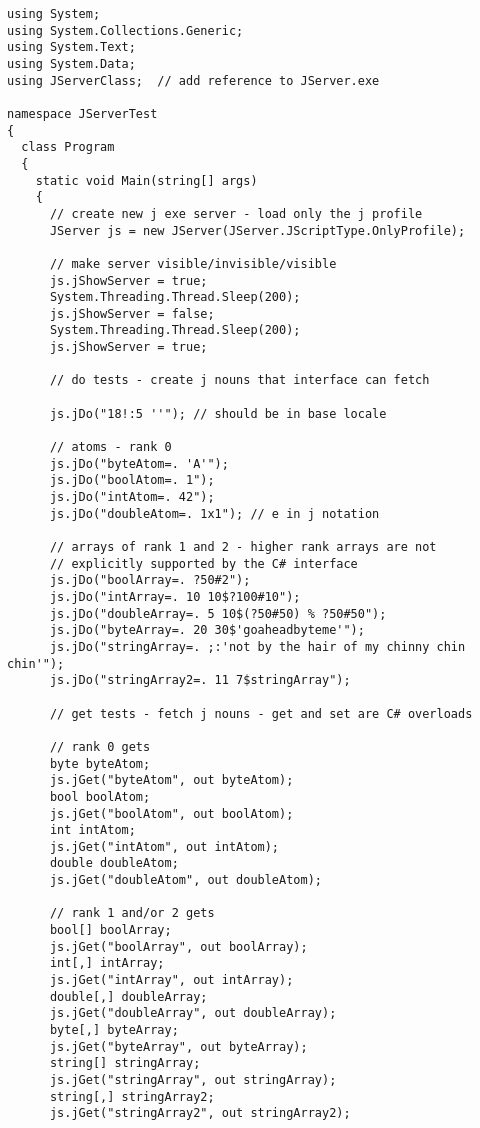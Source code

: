 \begin{tcolorbox}[breakable, size=fbox, boxrule=1pt, pad at break*=1mm,colback=cellbackground, colframe=cellborder]
\lstset{style=sharpc, label=lst:scr537X0}
\begin{lstlisting}
using System;
using System.Collections.Generic;
using System.Text;
using System.Data;
using JServerClass;  // add reference to JServer.exe

namespace JServerTest
{
  class Program
  {
    static void Main(string[] args)
    {
      // create new j exe server - load only the j profile
      JServer js = new JServer(JServer.JScriptType.OnlyProfile);

      // make server visible/invisible/visible
      js.jShowServer = true;
      System.Threading.Thread.Sleep(200);
      js.jShowServer = false;
      System.Threading.Thread.Sleep(200);
      js.jShowServer = true;

      // do tests - create j nouns that interface can fetch

      js.jDo("18!:5 ''"); // should be in base locale

      // atoms - rank 0
      js.jDo("byteAtom=. 'A'");
      js.jDo("boolAtom=. 1");
      js.jDo("intAtom=. 42");
      js.jDo("doubleAtom=. 1x1"); // e in j notation

      // arrays of rank 1 and 2 - higher rank arrays are not
      // explicitly supported by the C# interface
      js.jDo("boolArray=. ?50#2");
      js.jDo("intArray=. 10 10$?100#10");
      js.jDo("doubleArray=. 5 10$(?50#50) % ?50#50");
      js.jDo("byteArray=. 20 30$'goaheadbyteme'");
      js.jDo("stringArray=. ;:'not by the hair of my chinny chin chin'");
      js.jDo("stringArray2=. 11 7$stringArray");

      // get tests - fetch j nouns - get and set are C# overloads

      // rank 0 gets
      byte byteAtom;
      js.jGet("byteAtom", out byteAtom);
      bool boolAtom;
      js.jGet("boolAtom", out boolAtom);
      int intAtom;
      js.jGet("intAtom", out intAtom);
      double doubleAtom;
      js.jGet("doubleAtom", out doubleAtom);

      // rank 1 and/or 2 gets
      bool[] boolArray;
      js.jGet("boolArray", out boolArray);
      int[,] intArray;
      js.jGet("intArray", out intArray);
      double[,] doubleArray;
      js.jGet("doubleArray", out doubleArray);
      byte[,] byteArray;
      js.jGet("byteArray", out byteArray);
      string[] stringArray;
      js.jGet("stringArray", out stringArray);
      string[,] stringArray2;
      js.jGet("stringArray2", out stringArray2);


\end{lstlisting}
\end{tcolorbox}
